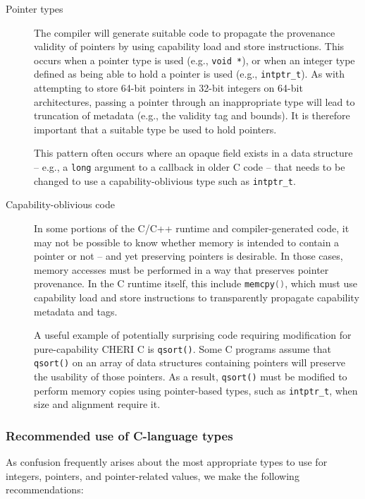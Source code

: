 \documentclass[11pt]{article}
\newcommand{\ccode}[1]{\lstinline[language={C},basicstyle=\small\ttfamily]{#1}}
\newcommand{\cfunc}[1]{\ccode{#1()}}
\newcommand{\intptr}{\texttt{intptr\_t}\xspace}
\begin{document}
\begin{description}
\item[Pointer types] The compiler will generate suitable code to propagate
  the provenance validity of pointers by using capability load and store
  instructions.
  This occurs when a pointer type is used (e.g., \texttt{void *}), or when an
  integer type defined as being able to hold a pointer is used (e.g.,
  \intptr).
  As with attempting to store 64-bit pointers in 32-bit integers on 64-bit
  architectures, passing a pointer through an inappropriate type will lead to
  truncation of metadata (e.g., the validity tag and bounds).
  It is therefore important that a suitable type be used to hold pointers.

  This pattern often occurs where an opaque field exists in a data structure
  -- e.g., a \texttt{long} argument to a callback in older C code -- that
  needs to be changed to use a capability-oblivious type such as \intptr.

\item[Capability-oblivious code] In some portions of the C/C++ runtime and
  com\-piler-generated code, it may not be possible to know whether memory is
  intended to contain a pointer or not -- and yet preserving pointers is
  desirable.
  In those cases, memory accesses must be performed in a way that preserves
  pointer provenance.
  In the C runtime itself, this include \cfunc{memcpy}, which must use
  capability load and store instructions to transparently propagate capability
  metadata and tags.

  A useful example of potentially surprising code requiring modification for
  pure-capability CHERI C is \texttt{qsort()}.
  Some C programs assume that \texttt{qsort()} on an array of data structures
  containing pointers will preserve the usability of those pointers.
  As a result, \texttt{qsort()} must be modified to perform memory copies using
  pointer-based types, such as \intptr, when size and alignment
  require it.
\end{description}

\subsubsection{Recommended use of C-language types}

As confusion frequently arises about the most appropriate types to use for
integers, pointers, and pointer-related values, we make the following
recommendations:
\end{document}
